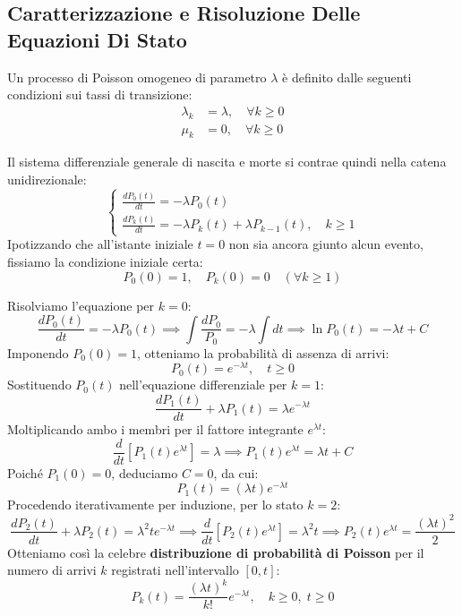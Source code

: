 \documentclass[11pt, a4paper]{article}
\begin{document}
\subsection{Caratterizzazione e Risoluzione Delle Equazioni Di Stato}

Un processo di Poisson omogeneo di parametro $\lambda$ è definito dalle seguenti condizioni sui tassi di transizione:
\begin{align*}
    \lambda_k &= \lambda, \quad \forall k \ge 0 \\
    \mu_k &= 0, \quad \forall k \ge 0
\end{align*}


Il sistema differenziale generale di nascita e morte si contrae quindi nella catena unidirezionale:
\begin{equation}
    \begin{cases}
        \displaystyle \frac{dP_0(t)}{dt} = -\lambda P_0(t) \\[10pt]
        \displaystyle \frac{dP_k(t)}{dt} = -\lambda P_k(t) + \lambda P_{k-1}(t), \quad k \ge 1
    \end{cases} \label{eq:poisson_system}
\end{equation}
Ipotizzando che all'istante iniziale $t=0$ non sia ancora giunto alcun evento, fissiamo la condizione iniziale certa:
\[
    P_0(0) = 1, \quad P_k(0) = 0 \quad (\forall k \ge 1)
\]

Risolviamo l'equazione per $k=0$:
\[
    \frac{dP_0(t)}{dt} = -\lambda P_0(t) \implies \int \frac{dP_0}{P_0} = -\lambda \int dt \implies \ln P_0(t) = -\lambda t + C
\]
Imponendo $P_0(0) = 1$, otteniamo la probabilità di assenza di arrivi:
\[
    \boxed{P_0(t) = e^{-\lambda t}, \quad t \ge 0}
\]
Sostituendo $P_0(t)$ nell'equazione differenziale per $k=1$:
\[
    \frac{dP_1(t)}{dt} + \lambda P_1(t) = \lambda e^{-\lambda t}
\]
Moltiplicando ambo i membri per il fattore integrante $e^{\lambda t}$:
\[
    \frac{d}{dt}\left[ P_1(t) e^{\lambda t} \right] = \lambda \implies P_1(t) e^{\lambda t} = \lambda t + C
\]
Poiché $P_1(0) = 0$, deduciamo $C = 0$, da cui:
\[
    \boxed{P_1(t) = (\lambda t) e^{-\lambda t}}
\]
Procedendo iterativamente per induzione, per lo stato $k=2$:
\[
    \frac{dP_2(t)}{dt} + \lambda P_2(t) = \lambda^2 t e^{-\lambda t} \implies \frac{d}{dt}\left[ P_2(t) e^{\lambda t} \right] = \lambda^2 t \implies P_2(t) e^{\lambda t} = \frac{(\lambda t)^2}{2}
\]
Otteniamo così la celebre \textbf{distribuzione di probabilità di Poisson} per il numero di arrivi $k$ registrati nell'intervallo $[0, t]$:
\[
    \boxed{P_k(t) = \frac{(\lambda t)^k}{k!} e^{-\lambda t}, \quad k \ge 0, \; t \ge 0}
\]
\end{document}
